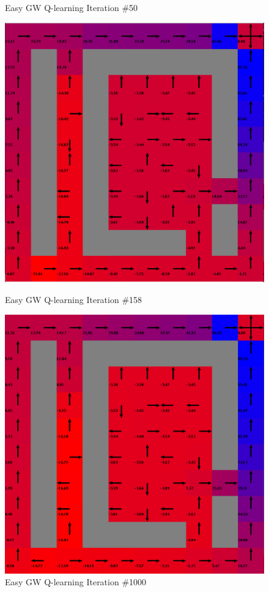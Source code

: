 \documentclass[h]{article}
\begin{document}
\begin{figure}[H]
      \caption*{Easy GW Q-learning Iteration \#50} 
   \endminipage\hfill
      \includegraphics[width=1\textwidth,keepaspectratio]{easy-q-158.png} 
      \caption*{Easy GW Q-learning Iteration \#158} 
   \endminipage\hfill
      \includegraphics[width=1\textwidth,keepaspectratio]{easy-q-1000.png} 
      \caption*{Easy GW Q-learning Iteration \#1000} 
   \endminipage\hfill
\end{figure}
\end{document}
